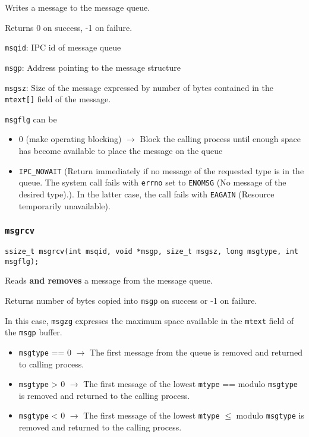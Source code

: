 \documentclass{article}
\begin{document}
Writes a message to the message queue.

Returns 0 on success, -1 on failure.

\texttt{msqid}: IPC id of message queue

\texttt{msgp}: Address pointing to the message structure

\texttt{msgsz}: Size of the message expressed by number of bytes contained in the \texttt{mtext[]} field of the message.

\texttt{msgflg} can be

\begin{itemize}
    \item 0 (make operating blocking) $\rightarrow$ Block the calling process until enough space has become available to place the message on the queue
    \item \texttt{IPC\_NOWAIT} (Return immediately if no message of the requested type is in the queue. The system call fails with \texttt{errno} set to \texttt{ENOMSG} (No message of the desired type).). In the latter case, the call fails with \texttt{EAGAIN} (Resource temporarily unavailable).
\end{itemize}


\subsubsection{\texttt{msgrcv}}

\begin{verbatim}
ssize_t msgrcv(int msqid, void *msgp, size_t msgsz, long msgtype, int msgflg);
\end{verbatim}

Reads \textbf{and removes} a message from the message queue.

Returns number of bytes copied into \texttt{msgp} on success or -1 on failure.

In this case, \texttt{msgzg} expresses the maximum space available in the \texttt{mtext} field of the \texttt{msgp} buffer.

\begin{itemize}
    \item \texttt{msgtype} == 0 $\rightarrow$ The first message from the queue is removed and returned to calling process.
    \item \texttt{msgtype} > 0 $\rightarrow$ The first message of the lowest \texttt{mtype} == modulo \texttt{msgtype} is removed and returned to the calling process.
    \item \texttt{msgtype} < 0 $\rightarrow$ The first message of the lowest \texttt{mtype} $\leq$ modulo \texttt{msgtype} is removed and returned to the calling process.
\end{itemize}
\end{document}
